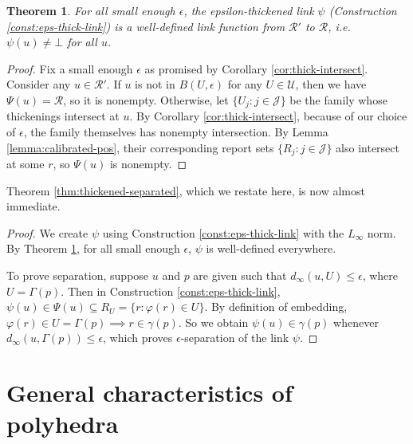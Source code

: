 \documentclass[11pt]{article}
\newcommand{\reals}{\mathbb{R}}
\newcommand{\R}{\mathcal{R}}
\newcommand{\U}{\mathcal{U}}
\newcommand{\Y}{\mathcal{Y}}
\newtheorem{theorem}{Theorem}
\begin{document}
\begin{theorem} \label{thm:small-eps-thick}
  For all small enough $\epsilon$, the epsilon-thickened link $\psi$ (Construction \ref{const:eps-thick-link}) is a well-defined link function from $\R'$ to $\R$, i.e. $\psi(u) \neq \bot$ for all $u$.
\end{theorem}
\begin{proof}
  Fix a small enough $\epsilon$ as promised by Corollary \ref{cor:thick-intersect}.
  Consider any $u \in \R'$.
  If $u$ is not in $B(U,\epsilon)$ for any $U \in \U$, then we have $\Psi(u) = \R$, so it is nonempty.
  Otherwise, let $\{U_j : j \in \mathcal{J}\}$ be the family whose thickenings intersect at $u$.
  By Corollary \ref{cor:thick-intersect}, because of our choice of $\epsilon$, the family themselves has nonempty intersection.
  By Lemma \ref{lemma:calibrated-pos}, their corresponding report sets $\{R_j : j \in \mathcal{J}\}$ also intersect at some $r$, so $\Psi(u)$ is nonempty.
\end{proof}

Theorem \ref{thm:thickened-separated}, which we restate here, is now almost immediate.
\thickenedseparated*
\begin{proof}
  We create $\psi$ using Construction \ref{const:eps-thick-link} with the $L_{\infty}$ norm.
  By Theorem \ref{thm:small-eps-thick}, for all small enough $\epsilon$, $\psi$ is well-defined everywhere.

  To prove separation, suppose $u$ and $p$ are given such that $d_{\infty}(u,U) \leq \epsilon$, where $U = \Gamma(p)$.
  Then in Construction \ref{const:eps-thick-link}, $\psi(u) \in \Psi(u) \subseteq R_U = \{r : \varphi(r) \in U\}$.
  By definition of embedding, $\varphi(r) \in U = \Gamma(p) \implies r \in \gamma(p)$.
  So we obtain $\psi(u) \in \gamma(p)$ whenever $d_{\infty}(u,\Gamma(p)) \leq \epsilon$, which proves $\epsilon$-separation of the link $\psi$.
\end{proof}

\section{General characteristics of polyhedra}
\end{document}
